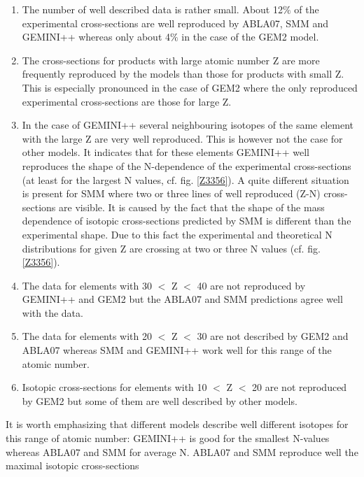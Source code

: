 \begin{enumerate}[label=\roman*)]
    \item  The number of well described data is rather small. About 12$\%$ of the experimental cross-sections are well reproduced by ABLA07, SMM and GEMINI++ whereas only about 4$\%$ in the case of the GEM2 model.
    
    \item The cross-sections for products with large atomic number Z are more frequently reproduced by the models
    than those for products with small Z. This is especially pronounced in the case of GEM2 where the only reproduced
    experimental cross-sections are those for large Z.

    \item In the case of GEMINI++ several neighbouring isotopes of the same element with the large Z are very well
    reproduced. This is however not the case for other models. It indicates that for these elements GEMINI++ well reproduces
    the shape of the N-dependence of the experimental cross-sections (at least for the largest N values, cf. fig. \ref{Z3356}).
    A quite different situation is present for SMM where two or three lines of well reproduced (Z-N) cross-sections are
    visible. It is caused by the fact that the shape of the mass dependence of isotopic cross-sections predicted by SMM
    is different than the experimental shape. Due to this fact the experimental and theoretical N distributions for given Z
    are crossing at two or three N values (cf. fig. \ref{Z3356}). 

    \item The data for elements with 30 $<$ Z $<$ 40 are not reproduced by GEMINI++ and GEM2 but the ABLA07
    and SMM predictions agree well with the data.

    \item  The data for elements with 20 $<$ Z $<$ 30 are not described by GEM2 and ABLA07 whereas SMM and GEMINI++
    work well for this range of the atomic number.

    \item Isotopic cross-sections for elements with 10 $<$ Z $<$ 20 are not reproduced by GEM2 but some of them are well described by other models.

\end{enumerate}
It is worth emphasizing that different models describe
well different isotopes for this range of atomic number:
GEMINI++ is good for the smallest N-values whereas
ABLA07 and SMM for average N. ABLA07 and 
SMM reproduce well the maximal isotopic  cross-sections 
